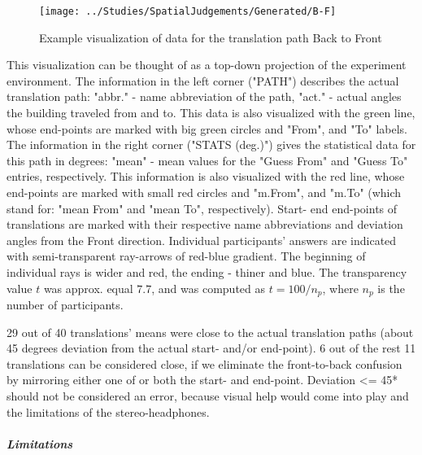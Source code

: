 \begin{figure}
	\centering
	\texttt{[image: ../Studies/SpatialJudgements/Generated/B-F]}
	\caption{Example visualization of data for the translation path Back to Front}
	\label{fig:b-f}
\end{figure}

This visualization can be thought of as a top-down projection of the experiment environment.
The information in the left corner ("PATH") describes the actual translation path: "abbr." - name abbreviation of the path, "act." - actual angles the building traveled from and to. This data is also visualized with the green line, whose end-points are marked with big green circles and "From", and "To" labels.
The information in the right corner ("STATS (deg.)") gives the statistical data for this path in degrees: "mean" - mean values for the "Guess From" and "Guess To" entries, respectively. This information is also visualized with the red line, whose end-points are marked with small red circles and "m.From", and "m.To" (which stand for: "mean From" and "mean To", respectively).
Start- end end-points of translations are marked with their respective name abbreviations and deviation angles from the Front direction.
Individual participants' answers are indicated with semi-transparent ray-arrows of red-blue gradient. The beginning of individual rays is wider and red, the ending - thiner and blue. The transparency value $t$ was approx. equal $7.7$, and was computed as $t = 100 / n_{p}$, where $ n_{p} $ is the number of participants.

29 out of 40 translations' means were close to the actual translation paths (about 45 degrees deviation from the actual start- and/or end-point). %
6 out of the rest 11 translations can be considered close, if we eliminate the front-to-back confusion by mirroring either one of or both the start- and end-point.
Deviation <= 45* should not be considered an error, because visual help would come into play and the limitations of the stereo-headphones.

\subparagraph{Limitations}
















